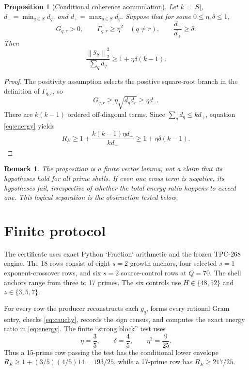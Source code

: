 \documentclass[10pt]{article}
\newtheorem{proposition}{Proposition}
\newtheorem{remark}{Remark}
\newcommand{\norm}[1]{\left\lVert #1\right\rVert}
\begin{document}
\begin{proposition}[Conditional coherence accumulation]
Let $k=|S|$, $d_- =\min_{q\in S}d_q$, and
$d_+=\max_{q\in S}d_q$.  Suppose that for some $0\leq\eta,\delta\leq1$,
\[
 G_{q,r}>0,\qquad \Gamma_{q,r}\geq\eta^2\quad(q\ne r),
 \qquad \frac{d_-}{d_+}\geq\delta.
 \label{eq:hypotheses}
\]
Then
\begin{equation}
 \frac{\norm{g_S}_2^2}{\sum_qd_q}
 \geq 1+\eta\delta(k-1).
 \label{eq:accumulation}
\end{equation}
\end{proposition}

\begin{proof}
The positivity assumption selects the positive square-root branch in the
definition of $\Gamma_{q,r}$, so
\[
 G_{q,r}\geq\eta\sqrt{d_qd_r}\geq\eta d_-.
\]
There are $k(k-1)$ ordered off-diagonal terms.  Since
$\sum_qd_q\leq kd_+$, equation \eqref{eq:energy} yields
\[
 R_E\geq1+\frac{k(k-1)\eta d_-}{kd_+}
 \geq1+\eta\delta(k-1).
\]
\end{proof}

\begin{remark}
The proposition is a finite vector lemma, not a claim that its hypotheses
hold for all prime shells.  If even one cross term is negative, its hypotheses
fail, irrespective of whether the total energy ratio happens to exceed one.
This logical separation is the obstruction tested below.
\end{remark}

\section{Finite protocol}

The certificate uses exact Python `Fraction` arithmetic and the frozen
TPC-268 engine.  The 18 rows consist of eight $s=2$ growth anchors, four
selected $s=1$ exponent-crossover rows, and six $s=2$ source-control rows at
$Q=70$.  The shell anchors range from three to 17 primes.  The six controls
use $H\in\{48,52\}$ and $z\in\{3,5,7\}$.

For every row the producer reconstructs each $g_q$, forms every rational Gram
entry, checks \eqref{eq:cauchy}, records the sign census, and computes the
exact energy ratio in \eqref{eq:energy}.  The finite ``strong block'' test uses
\[
 \eta=\frac35,\qquad \delta=\frac45,
 \qquad \eta^2=\frac9{25}.
\]
Thus a 15-prime row passing the test has the conditional lower envelope
$R_E\geq1+(3/5)(4/5)14=193/25$, while a 17-prime row has
$R_E\geq217/25$.
\end{document}
